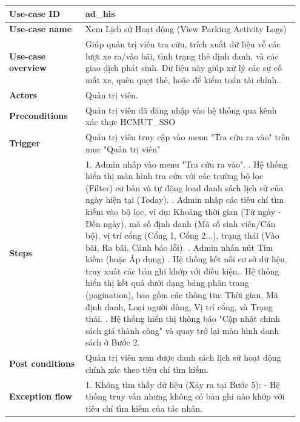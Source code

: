 \begin{table}[htpb]
\centering
\renewcommand{\arraystretch}{1.4}
\begin{tabular}{|p{0.25\linewidth}|p{0.7\linewidth}|}
\hline
\textbf{Use-case ID} & ad\_his \\ \hline
\textbf{Use-case name} & Xem Lịch sử Hoạt động (View Parking Activity Logs) \\ \hline
\textbf{Use-case overview} & Giúp quản trị viên tra cứu, trích xuất dữ liệu về các lượt xe ra/vào bãi, tình trạng thẻ định danh, và các giao dịch phát sinh. Dữ liệu này giúp xử lý các sự cố mất xe, quên quẹt thẻ, hoặc để kiểm toán tài chính.. \\ \hline
\textbf{Actors} & Quản trị viên. \\ \hline
\textbf{Preconditions} & Quản trị viên đã đăng nhập vào hệ thống qua kênh xác thực HCMUT\_SSO \\ \hline
\textbf{Trigger} & Quản trị viên truy cập vào menu "Tra cứu ra vào" trên mục "Quản trị viên" \\ \hline
\textbf{Steps} & 
1. Admin nhấp vào menu "Tra cứu ra vào". \newline
2. Hệ thống hiển thị màn hình tra cứu với các trường bộ lọc (Filter) cơ bản và tự động load danh sách lịch sử của ngày hiện tại (Today). \newline
3. Admin nhập các tiêu chí tìm kiếm vào bộ lọc, ví dụ: Khoảng thời gian (Từ ngày - Đến ngày), mã số định danh (Mã số sinh viên/Cán bộ), vị trí cổng (Cổng 1, Cổng 2...), trạng thái (Vào bãi, Ra bãi, Cảnh báo lỗi). \newline
4. Admin nhấn nút Tìm kiếm (hoặc Áp dụng) \newline
5. Hệ thống kết nối cơ sở dữ liệu, truy xuất các bản ghi khớp với điều kiện.\newline
6. Hệ thống hiển thị kết quả dưới dạng bảng phân trang (pagination), bao gồm các thông tin: Thời gian, Mã định danh, Loại người dùng, Vị trí cổng, và Trạng thái. \newline
7. Hệ thống hiển thị thông báo "Cập nhật chính sách giá thành công" và quay trở lại màn hình danh sách ở Bước 2.\\ \hline
\textbf{Post conditions} & Quản trị viên xem được danh sách lịch sử hoạt động chính xác theo tiêu chí tìm kiếm.\\ \hline
\textbf{Exception flow} & 
1. Không tìm thấy dữ liệu (Xảy ra tại Bước 5): \newline
- Hệ thống truy vấn nhưng không có bản ghi nào khớp với tiêu chí tìm kiếm của tác nhân. \newline

\end{tabular}
\end{table}
